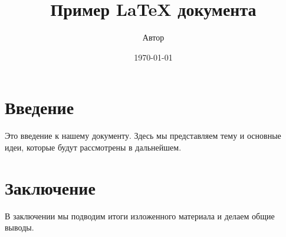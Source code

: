 \documentclass{article}
\title{Пример LaTeX документа}
\author{Автор}
\date{\today}
\begin{document}
\maketitle

\section{Введение}
Это введение к нашему документу. Здесь мы представляем тему и основные идеи, которые будут рассмотрены в дальнейшем.

\section{Заключение}
В заключении мы подводим итоги изложенного материала и делаем общие выводы.
\end{document}
